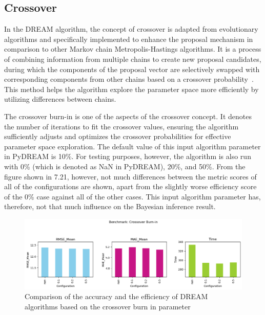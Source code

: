 \subsection{Crossover}

In the DREAM algorithm, the concept of crossover is adapted from evolutionary algorithms and specifically implemented to enhance the proposal mechanism in comparison to other Markov chain Metropolis-Hastings algorithms. It is a process of combining information from multiple chains to create new proposal candidates, during which the components of the proposal vector are selectively swapped with corresponding components from other chains based on a crossover probability~\cite{dream}. This method helps the algorithm explore the parameter space more efficiently by utilizing differences between chains.

The crossover burn-in is one of the aspects of the crossover concept. It denotes the number of iterations to fit the crossover values, ensuring the algorithm sufficiently adjusts and optimizes the crossover probabilities for effective parameter space exploration. The default value of this input algorithm parameter in PyDREAM is 10\%. For testing purposes, however, the algorithm is also run with 0\% (which is denoted as NaN in PyDREAM), 20\%, and 50\%. From the figure shown in 7.21, however, not much differences between the metric scores of all of the configurations are shown, apart from the slightly worse efficiency score of the 0\% case against all of the other cases. This input algorithm parameter has, therefore, not that much influence on the Bayesian inference result.
\begin{figure}[H]
    \centering
    \includegraphics[width=1\textwidth]{figures/dream/crossover_burn_in.png}
    \captionsetup{width=.8\textwidth}
    \caption{Comparison of the accuracy and the efficiency of DREAM algorithms based on the crossover burn in parameter}
    \label{fig:enter-label}
\end{figure}

